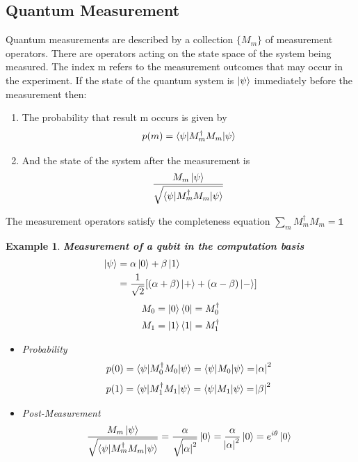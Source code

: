 \documentclass[]{book}
\newtheorem*{example}{Example}
\theoremstyle{nonumberplain}
\begin{document}
\subsection{Quantum Measurement}
\begin{postu}
	Quantum measurements are described by a collection $\{M_{m}\}$ of measurement operators. There are operators acting on the state space of the system being measured. The index m refers to the measurement outcomes that may occur in the experiment. If the state of the quantum system is $\ket{\psi}$ immediately before the measurement then:
\begin{enumerate}
	\item The probability that result m occurs is given by 
		\[
			p(m) = \braket{\psi|M_{m}^{\dagger}M_{m}|\psi}
		\] 
	\item And the state of the system after the measurement is 
		\[
			\frac{M_{m}\ket{\psi}}{\sqrt{\braket{\psi|M_{m}^{\dagger}M_{m}|\psi}}}
		\] 
\end{enumerate}
The measurement operators satisfy the completeness equation $\sum^{}_{m} M^{\dagger}_{m}M_{m}=\mathds{1}$ 
\end{postu}
\begin{example}
\textbf{Measurement of a qubit in the computation basis}
\begin{equation*}
\begin{aligned}
	\ket{\psi} &= \alpha\ket{0}+\beta\ket{1}\\
				  &=	\frac{1}{\sqrt{2}}[(\alpha+\beta)\ket{+}+(\alpha-\beta)\ket{-}] \\
\end{aligned}
\end{equation*}
\begin{equation*}
\begin{aligned}
	M_{0} &= \ket{0}\bra{0}=M_{0}^{\dagger} \\
	M_{1} &= \ket{1}\bra{1}=M_{1}^{\dagger}
\end{aligned}
\end{equation*}
\begin{itemize}
	\item Probability
		\[
			p(0) = \braket{\psi|M_{0}^{\dagger}M_{0}|\psi} = \braket{\psi|M_{0}|\psi} = \abs{\alpha}^{2}
		\] 
		\[
			p(1) = \braket{\psi|M_{1}^{\dagger}M_{1}|\psi} = \braket{\psi|M_{1}|\psi} = \abs{\beta}^{2}
		\] 
	\item Post-Measurement
\[
	\frac{M_{m}\ket{\psi}}{\sqrt{\braket{\psi|M_{m}^{\dagger}M_{m}|\psi}}}=\frac{\alpha}{\sqrt{\abs{\alpha}^{2}}}\ket{0}=\frac{\alpha}{\abs{\alpha}^{2}}\ket{0}=e^{i\theta}\ket{0}
\] 
\end{itemize}
\end{example}
\end{document}
